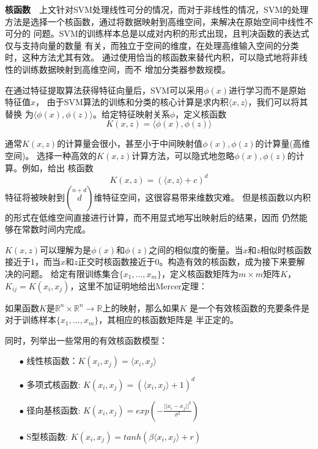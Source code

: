 \textbf{核函数}~~上文针对SVM处理线性可分的情况，而对于非线性的情况，SVM的处理
方法是选择一个核函数，通过将数据映射到高维空间，来解决在原始空间中线性不可分的
问题。SVM的训练样本总是以成对内积的形式出现，且判决函数的表达式仅与支持向量的数量
有关，而独立于空间的维度，在处理高维输入空间的分类时，这种方法尤其有效。
通过使用恰当的核函数来替代内积，可以隐式地将非线性的训练数据映射到高维空间，而不
增加分类器参数规模。

在通过特征提取算法获得特征向量后，SVM可以采用$\phi(x)$进行学习而不是原始特征值$x$，
由于SVM算法的训练和分类的核心计算是求内积$\langle{}x,z\rangle$，我们可以将其替换
为$\langle{}\phi(x),\phi(z)\rangle$。给定特征映射关系$\phi$，定义核函数
\begin{equation}
    K(x,z)=\langle\phi(x),\phi(z)\rangle
\end{equation}

通常$K(x,z)$的计算量会很小，甚至小于中间映射值$\phi(x),\phi(z)$的计算量(高维空间)。
选择一种高效的$K(x,z)$计算方法，可以隐式地忽略$\phi(x),\phi(z)$的计算。例如，给出
核函数
\begin{equation}
    K(x,z)=(\langle{}x,z\rangle+c)^d
\end{equation}
特征将被映射到$\left(\stackrel{n+d}{d}\right)$维特征空间，这很容易带来维数灾难。
但是核函数以内积的形式在低维空间直接进行计算，而不用显式地写出映射后的结果，因而
仍然能够在常数时间内完成。

$K(x,z)$可以理解为是$\phi(x)$和$\phi(z)$之间的相似度的衡量。当$x$和$z$相似时核函数
接近于1，而当$x$和$z$正交时核函数接近于0。构造有效的核函数，成为接下来要解决的问题。
给定有限训练集合$\{x_1,...,x_m\}$，定义核函数矩阵为$m\times{}m$矩阵$K$，
$K_{ij}=K(x_i,x_j)$，这里不加证明地给出Mercer定理：
\begin{dingli}
    如果函数$K$是$\mathbb{R}^n\times\mathbb{R}^n\to\mathbb{R}$上的映射，那么如果$K$
    是一个有效核函数的充要条件是对于训练样本$\{x_1,...,x_m\}$，其相应的核函数矩阵是
    半正定的。
\end{dingli}

同时，列举出一些常用的有效核函数模型：
\begin{enumerate}
    \item[$\bullet$] 线性核函数：$K(x_i,x_j)=\langle{}x_i,x_j\rangle$
    \item[$\bullet$] 多项式核函数: $K(x_i,x_j)=(\langle{}x_i,x_j\rangle+1)^d$
    \item[$\bullet$] 径向基核函数: $K(x_i,x_j)=exp(-\frac{||x_i-x_j||^2}{\sigma^2})$
    \item[$\bullet$] S型核函数: $K(x_i,x_j)=tanh(\beta\langle{}x_i,x_j\rangle+r)$
\end{enumerate}

